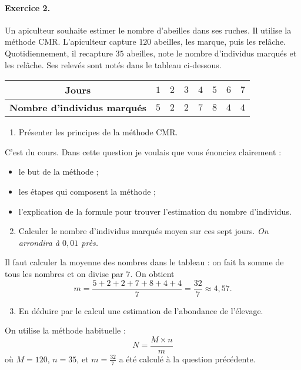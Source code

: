 \documentclass[11pt]{article}
\begin{document}
\paragraph{Exercice 2.} Un apiculteur souhaite estimer le nombre d'abeilles dans
ses ruches. Il utilise la méthode CMR. L'apiculteur capture $120$ abeilles, les
marque, puis les rel\^ache. Quotidiennement, il recapture $35$ abeilles, note le
nombre d'individus marqués et les rel\^ache. Ses relevés sont notés dans le
tableau ci-dessous.
\begin{center}
  \renewcommand{\arraystretch}{1.2}
  \begin{tabular}[]{|c|c|c|c|c|c|c|c|}
    \hline
    \textbf{Jours} & $1$ & $2$ & $3$ & $4$ & $5$ & $6$ & $7$ \\
    \hline
    \textbf{Nombre d'individus marqués} & $5$ & $2$ & $2$ & $7$ & $8$ & $4$ &
    $4$ \\
    \hline
  \end{tabular}
\end{center}
\begin{enumerate}
  \item Présenter les principes de la méthode CMR.
\end{enumerate}
C'est du cours. Dans cette question je voulais que vous énonciez clairement : 
\begin{itemize}
  \item le but de la méthode ;
  \item les étapes qui composent la m\'ethode ;
  \item l'explication de la formule pour trouver l'estimation du nombre
    d'individus.
\end{itemize}
\begin{enumerate}
    \setcounter{enumi}{1}
  \item Calculer le nombre d'individus marqués moyen sur ces sept jours.
    \emph{On arrondira à $0,01$ près.}
\end{enumerate}
Il faut calculer la moyenne des nombres dans le tableau : on fait la somme de
tous les nombres et on divise par $7$. On obtient
\[
  m=\frac{5+2+2+7+8+4+4}{7}=\frac{32}{7}\approx4,57.
\]
\begin{enumerate}
    \setcounter{enumi}{2}
  \item En déduire par le calcul une estimation de l'abondance de l'élevage.
\end{enumerate}
On utilise la méthode habituelle :
\[
  N = \frac{M\times n}{m}
\]
où $M=120$, $n=35$, et $m=\frac{32}{7}$ a été calculé à la question précédente.
\end{document}
